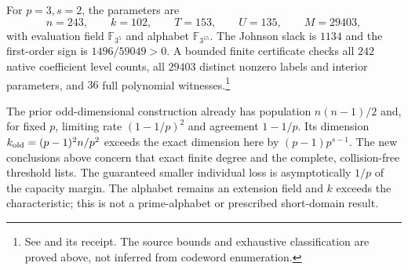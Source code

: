 For $p=3,s=2$, the parameters are
\[
 n=243,\qquad k=102,\qquad T=153,\qquad U=135,\qquad M=29403,
\]
with evaluation field $\mathbb F_{3^5}$ and alphabet
$\mathbb F_{3^{15}}$. The Johnson slack is $1134$ and the
first-order sign is $1496/59049>0$. A bounded finite certificate
checks all $242$ native coefficient level counts, all $29403$
distinct nonzero labels and interior parameters, and $36$ full
polynomial witnesses.\footnote{See
and its receipt. The source bounds and exhaustive classification
are proved above, not inferred from codeword enumeration.}

The prior odd-dimensional construction already has population
$n(n-1)/2$ and, for fixed $p$, limiting rate $(1-1/p)^2$ and
agreement $1-1/p$. Its dimension
$k_{\rm old}=(p-1)^2n/p^2$ exceeds the exact dimension here by
$(p-1)p^{s-1}$. The new conclusions above concern that exact
finite degree and the complete, collision-free threshold lists.
The guaranteed smaller individual loss is asymptotically $1/p$
of the capacity margin. The alphabet remains an extension field
and $k$ exceeds the characteristic; this is not a prime-alphabet
or prescribed short-domain result.

